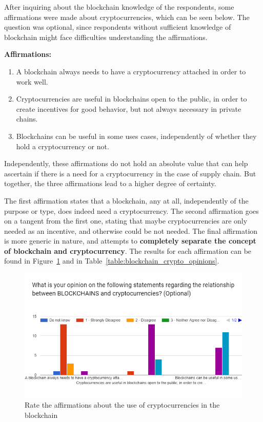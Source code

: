 After inquiring about the blockchain knowledge of the respondents, some affirmations were made about cryptocurrencies, which can be seen below. The question was optional, since respondents without sufficient knowledge of blockchain might face difficulties understanding the affirmations.


\textbf{Affirmations: }
\begin{enumerate}
\item A blockchain always needs to have a cryptocurrency attached in order to work well.
\item Cryptocurrencies are useful in blockchains open to the public, in order to create incentives for good behavior, but not always necessary in private chains.
\item Blockchains can be useful in some uses cases, independently of whether they hold a cryptocurrency or not.
\end{enumerate}

Independently, these affirmations do not hold an absolute value that can help ascertain if there is a need for a cryptocurrency in the case of supply chain. But together, the three affirmations lead to a higher degree of certainty.

The first affirmation states that a blockchain, any at all, independently of the purpose or type, does indeed need a cryptocurrency. The second affirmation goes on a tangent from the first one, stating that maybe cryptocurrencies are only needed as an incentive, and otherwise could be not needed. The final affirmation is more generic in nature, and attempts to \textbf{completely separate the concept of blockchain and cryptocurrency}. The results for each affirmation can be found in Figure~\ref{fig:blockchain_crypto_opinions} and in Table~\ref{table:blockchain_crypto_opinions}.

\begin{figure}[h]
\centering
\includegraphics[scale=0.60]{media/blockchain_crypto_opinions.png}
\caption[Rate the affirmations about the use of cryptocurrencies in the blockchain]{Rate the affirmations about the use of cryptocurrencies in the blockchain}
\label{fig:blockchain_crypto_opinions}
\end{figure}



